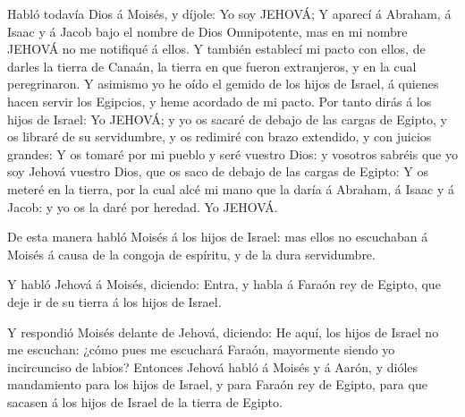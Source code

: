  Habló todavía Dios á Moisés, y díjole: Yo soy JEHOVÁ;
 Y aparecí á Abraham, á Isaac y á Jacob bajo el nombre de
Dios Omnipotente, mas en mi nombre JEHOVÁ no me notifiqué á ellos.
 Y también establecí mi pacto con ellos, de darles la tierra
de Canaán, la tierra en que fueron extranjeros, y en la cual
peregrinaron.  Y asimismo yo he oído el gemido de los hijos
de Israel, á quienes hacen servir los Egipcios, y heme acordado de mi
pacto.  Por tanto dirás á los hijos de Israel: Yo JEHOVÁ; y
yo os sacaré de debajo de las cargas de Egipto, y os libraré de su
servidumbre, y os redimiré con brazo extendido, y con juicios grandes:
 Y os tomaré por mi pueblo y seré vuestro Dios: y vosotros
sabréis que yo soy Jehová vuestro Dios, que os saco de debajo de las
cargas de Egipto:  Y os meteré en la tierra, por la cual
alcé mi mano que la daría á Abraham, á Isaac y á Jacob: y yo os la daré
por heredad. Yo JEHOVÁ.

 De esta manera habló Moisés á los hijos de Israel: mas
ellos no escuchaban á Moisés á causa de la congoja de espíritu, y de la
dura servidumbre.

 Y habló Jehová á Moisés, diciendo:  Entra, y
habla á Faraón rey de Egipto, que deje ir de su tierra á los hijos de
Israel.

 Y respondió Moisés delante de Jehová, diciendo: He aquí,
los hijos de Israel no me escuchan: ¿cómo pues me escuchará Faraón,
mayormente siendo yo incircunciso de labios?  Entonces
Jehová habló á Moisés y á Aarón, y dióles mandamiento para los hijos de
Israel, y para Faraón rey de Egipto, para que sacasen á los hijos de
Israel de la tierra de Egipto.

